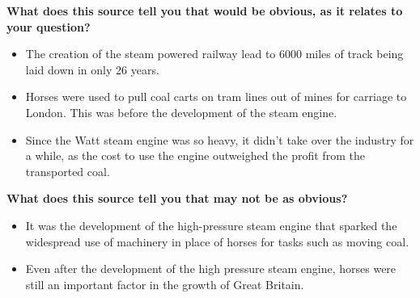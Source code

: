 

\textbf{What does this source tell you that would be obvious, as it relates to your question?}
\begin{itemize}
    \item The creation of the steam powered railway lead to 6000 miles of track being laid down in only 26 years.
    \item Horses were used to pull coal carts on tram lines out of mines for carriage to London.  This was before the development of the steam engine.
    \item Since the Watt steam engine was so heavy, it didn't take over the industry for a while, as the cost to use the engine outweighed the profit from the transported coal. 
    \\
\end{itemize}

\textbf{What does this source tell you that may not be as obvious?}
\begin{itemize}
    \item It was the development of the high-pressure steam engine that sparked the widespread use of machinery in place of horses for tasks such as moving coal.
    \item Even after the development of the high pressure steam engine, horses were still an important factor in the growth of Great Britain.
\end{itemize}